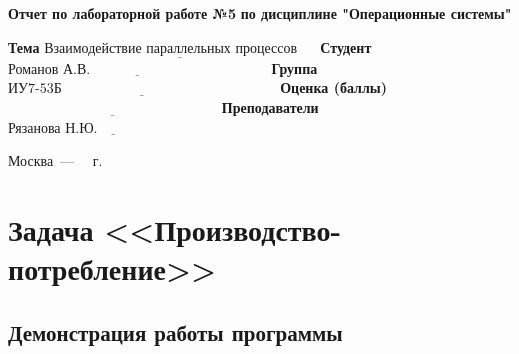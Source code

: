 \documentclass[12pt]{report}
\begin{document}
\begin{titlepage}
	\begin{center}
		\noindent\begin{minipage}{1.3\textwidth}\centering
			\Large\textbf{  Отчет по лабораторной работе №5}\newline
			\textbf{по дисциплине "Операционные системы"}\newline\newline
		\end{minipage}
	\end{center}
	
	\noindent\textbf{Тема} $\underline{\text{Взаимодействие параллельных процессов~~~~}}$\newline\newline
	\noindent\textbf{Студент} $\underline{\text{Романов А.В.~~~~~~~~~~~~~~~~~~~~~~~~~~~~~~~~~~~~~~}}$\newline\newline
	\noindent\textbf{Группа} $\underline{\text{ИУ7-53Б~~~~~~~~~~~~~~~~~~~~~~~~~~~~~~~~~~~~~~~~~~~~~~}}$\newline\newline
	\noindent\textbf{Оценка (баллы)} $\underline{\text{~~~~~~~~~~~~~~~~~~~~~~~~~~~~~~~~~~~~~~~~~~~~~}}$\newline\newline
	\noindent\textbf{Преподаватели} $\underline{\text{Рязанова Н.Ю.~~~~~~~~~~~~~~~~~~~~~~~~~~}}$\newline\newline\newline
	
	\begin{center}
		\vfill
		Москва~---~\the\year
		~г.
	\end{center}
\end{titlepage}

\chapter{Задача <<Производство-потребление>>}

\section{Демонстрация работы программы}
\end{document}

